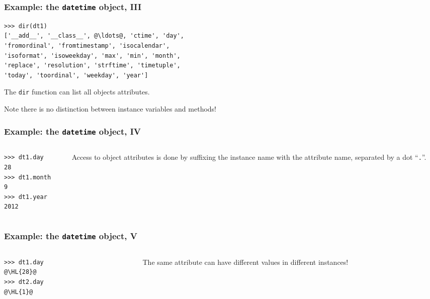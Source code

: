 \documentclass[english,serif,mathserif,xcolor=pdftex,dvipsnames,table]{beamer}
\begin{document}
\begin{frame}[fragile]
  \frametitle{Example: the \texttt{datetime} object, III}
\begin{lstlisting}
>>> dir(dt1)
['__add__', '__class__', @\ldots@, 'ctime', 'day',
'fromordinal', 'fromtimestamp', 'isocalendar',
'isoformat', 'isoweekday', 'max', 'min', 'month',
'replace', 'resolution', 'strftime', 'timetuple',
'today', 'toordinal', 'weekday', 'year']
\end{lstlisting}

  \+
  The \texttt{dir} function can list all objects attributes.

  \+
  Note there is no distinction between instance variables and
  methods!
\end{frame}


\begin{frame}[fragile]
  \frametitle{Example: the \texttt{datetime} object, IV}
  \begin{columns}[c]
    \begin{column}{0.5\textwidth}
\begin{lstlisting}
>>> dt1.day
28
>>> dt1.month
9
>>> dt1.year
2012
\end{lstlisting}
    \end{column}
    \begin{column}{0.5\textwidth}
      \raggedleft
      Access to object attributes is done by suffixing the
      instance name with the attribute name, separated by a dot
      ``\texttt{.}''.
    \end{column}
  \end{columns}
\end{frame}


\begin{frame}[fragile]
  \frametitle{Example: the \texttt{datetime} object, V}
  \begin{columns}[c]
    \begin{column}{0.5\textwidth}
\begin{lstlisting}
>>> dt1.day
@\HL{28}@
>>> dt2.day
@\HL{1}@
\end{lstlisting}
    \end{column}
    \begin{column}{0.5\textwidth}
      \raggedleft
      The same attribute can have different
      values in different instances!
    \end{column}
  \end{columns}
\end{frame}
\end{document}
